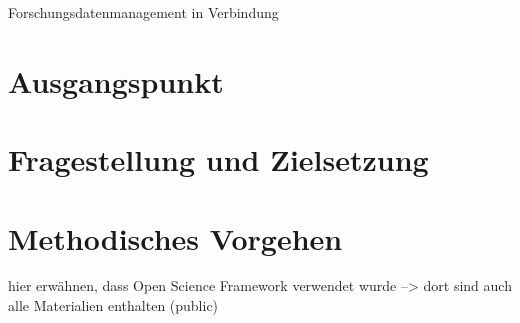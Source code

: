 \onehalfspacing

Forschungsdatenmanagement in Verbindung

\section{Ausgangspunkt}

\section{Fragestellung und Zielsetzung}

\section{Methodisches Vorgehen}

hier erwähnen, dass Open Science Framework verwendet wurde --> dort sind auch alle Materialien enthalten (public)